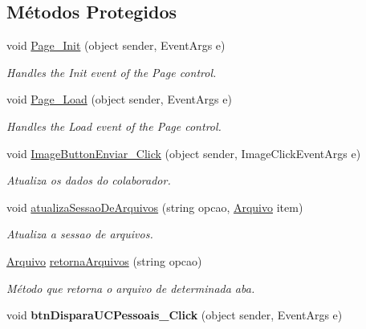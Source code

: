 \subsection*{Métodos Protegidos}
\begin{DoxyCompactItemize}
\item 
void \hyperlink{class_sistema_r_h_1_1_alterar_colaborador_ac5e7507d34ee5b0eea6ba34c635e4a8b}{Page\_\-Init} (object sender, EventArgs e)
\begin{DoxyCompactList}\small\item\em Handles the Init event of the Page control. \item\end{DoxyCompactList}\item 
void \hyperlink{class_sistema_r_h_1_1_alterar_colaborador_a7ad96c7361293ed9218479d1d8e4b87f}{Page\_\-Load} (object sender, EventArgs e)
\begin{DoxyCompactList}\small\item\em Handles the Load event of the Page control. \item\end{DoxyCompactList}\item 
void \hyperlink{class_sistema_r_h_1_1_alterar_colaborador_a41b6dee33e92a98841320b3375d24f98}{ImageButtonEnviar\_\-Click} (object sender, ImageClickEventArgs e)
\begin{DoxyCompactList}\small\item\em Atualiza os dados do colaborador. \item\end{DoxyCompactList}\item 
void \hyperlink{class_sistema_r_h_1_1_alterar_colaborador_a707bd38c9c75520a94fe8ecb52cf33f4}{atualizaSessaoDeArquivos} (string opcao, \hyperlink{class_sistema_r_h_1_1_arquivo}{Arquivo} item)
\begin{DoxyCompactList}\small\item\em Atualiza a sessao de arquivos. \item\end{DoxyCompactList}\item 
\hyperlink{class_sistema_r_h_1_1_arquivo}{Arquivo} \hyperlink{class_sistema_r_h_1_1_alterar_colaborador_a127c7e4e185cf751a392b93804098e20}{retornaArquivos} (string opcao)
\begin{DoxyCompactList}\small\item\em Método que retorna o arquivo de determinada aba. \item\end{DoxyCompactList}\item 
\hypertarget{class_sistema_r_h_1_1_alterar_colaborador_a378c3ca9058d7f382f8a8c00da0cb341}{
void {\bfseries btnDisparaUCPessoais\_\-Click} (object sender, EventArgs e)}
\label{class_sistema_r_h_1_1_alterar_colaborador_a378c3ca9058d7f382f8a8c00da0cb341}


\end{DoxyCompactItemize}
